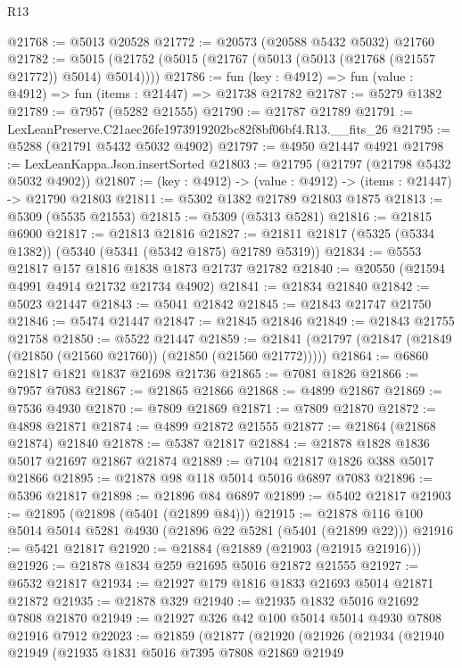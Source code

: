\begin{lexlean}{R13}
\begin{coremodule}
@21768 := @5013 @20528
@21772 := @20573 (@20588 @5432 @5032) @21760
@21782 := @5015 (@21752 (@5015 (@21767 (@5013 (@5013 (@21768 (@21557 @21772)) @5014) @5014))))
@21786 := fun (key : @4912) => fun (value : @4912) => fun (items : @21447) => @21738 @21782
@21787 := @5279 @1382
@21789 := @7957 (@5282 @21555)
@21790 := @21787 @21789
@21791 := LexLeanPreserve.C21aec26fe1973919202bc82f8bf06bf4.R13.__fits_26
@21795 := @5288 (@21791 @5432 @5032 @4902)
@21797 := @4950 @21447 @4921
@21798 := LexLeanKappa.Json.insertSorted
@21803 := @21795 (@21797 (@21798 @5432 @5032 @4902))
@21807 := (key : @4912) -> (value : @4912) -> (items : @21447) -> @21790 @21803
@21811 := @5302 @1382 @21789 @21803 @1875
@21813 := @5309 (@5535 @21553)
@21815 := @5309 (@5313 @5281)
@21816 := @21815 @6900
@21817 := @21813 @21816
@21827 := @21811 @21817 (@5325 (@5334 @1382)) (@5340 (@5341 (@5342 @1875) @21789 @5319))
@21834 := @5553 @21817 @157 @1816 @1838 @1873 @21737 @21782
@21840 := @20550 (@21594 @4991 @4914 @21732 @21734 @4902)
@21841 := @21834 @21840
@21842 := @5023 @21447
@21843 := @5041 @21842
@21845 := @21843 @21747 @21750
@21846 := @5474 @21447
@21847 := @21845 @21846
@21849 := @21843 @21755 @21758
@21850 := @5522 @21447
@21859 := @21841 (@21797 (@21847 (@21849 (@21850 (@21560 @21760)) (@21850 (@21560 @21772)))))
@21864 := @6860 @21817 @1821 @1837 @21698 @21736
@21865 := @7081 @1826
@21866 := @7957 @7083
@21867 := @21865 @21866
@21868 := @4899 @21867
@21869 := @7536 @4930
@21870 := @7809 @21869
@21871 := @7809 @21870
@21872 := @4898 @21871
@21874 := @4899 @21872 @21555
@21877 := @21864 (@21868 @21874) @21840
@21878 := @5387 @21817
@21884 := @21878 @1828 @1836 @5017 @21697 @21867 @21874
@21889 := @7104 @21817 @1826 @388 @5017 @21866
@21895 := @21878 @98 @118 @5014 @5016 @6897 @7083
@21896 := @5396 @21817
@21898 := @21896 @84 @6897
@21899 := @5402 @21817
@21903 := @21895 (@21898 (@5401 (@21899 @84)))
@21915 := @21878 @116 @100 @5014 @5014 @5281 @4930 (@21896 @22 @5281 (@5401 (@21899 @22)))
@21916 := @5421 @21817
@21920 := @21884 (@21889 (@21903 (@21915 @21916)))
@21926 := @21878 @1834 @259 @21695 @5016 @21872 @21555
@21927 := @6532 @21817
@21934 := @21927 @179 @1816 @1833 @21693 @5014 @21871 @21872
@21935 := @21878 @329
@21940 := @21935 @1832 @5016 @21692 @7808 @21870
@21949 := @21927 @326 @42 @100 @5014 @5014 @4930 @7808 @21916 @7912
@22023 := @21859
    (@21877
      (@21920
        (@21926
          (@21934
            (@21940
              @21949
              (@21935
                @1831
                @5016
                @7395
                @7808
                @21869
                @21949

\end{coremodule}
\end{lexlean}
